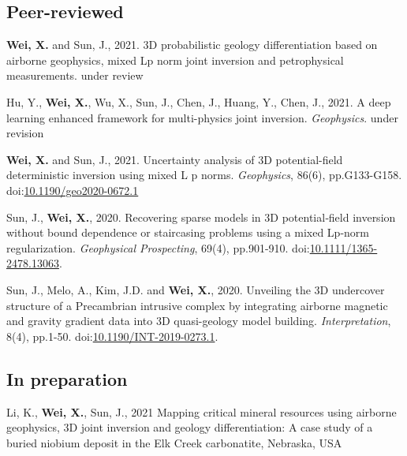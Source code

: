 \documentclass[11pt, a4paper]{article}
\newcommand{\LastName}{Wei}
\newcommand{\Initials}{X}
\newcommand{\Wei}{\textbf{\LastName, \Initials.}}  %
\newcommand{\WeiSun}{\textbf{\LastName, \Initials.} and Sun, J.}  %
\newcommand{\Review}{under review}
\newcommand{\Revision}{under revision}
\newcommand{\DOI}[1]{doi:\href{https://doi.org/#1}{#1}}
\begin{document}
\subsection*{Peer-reviewed}
\begin{etaremune}
	
	\item 
	\WeiSun, 2021. 3D probabilistic geology differentiation based on airborne geophysics, mixed Lp norm joint inversion and petrophysical measurements. \Review
	
	\item 
	Hu, Y., \Wei, Wu, X., Sun, J., Chen, J., Huang, Y., Chen, J., 2021. A deep learning enhanced framework for multi-physics joint inversion. \emph{Geophysics}. \Revision
	
	\item
	\WeiSun, 2021. Uncertainty analysis of 3D potential-field deterministic inversion using mixed L p norms. \emph{Geophysics}, 86(6), pp.G133-G158.
	\DOI{10.1190/geo2020-0672.1}

	\item
	Sun, J., \Wei, 2020. Recovering sparse models in 3D potential‐field inversion without bound dependence or staircasing problems using a mixed Lp‐norm regularization. \emph{Geophysical Prospecting}, 69(4), pp.901-910.
	\DOI{10.1111/1365-2478.13063}.

	\item
	Sun, J., Melo, A., Kim, J.D. and \Wei, 2020. Unveiling the 3D undercover structure of a Precambrian intrusive complex by integrating airborne magnetic and gravity gradient data into 3D quasi-geology model building. \emph{Interpretation}, 8(4), pp.1-50.
	\DOI{10.1190/INT-2019-0273.1}.

\end{etaremune}

\subsection*{In preparation}
\begin{etaremune}
	
	\item 
	Li, K., \Wei, Sun, J., 2021 Mapping critical mineral resources using airborne geophysics, 3D joint inversion and geology differentiation: A case study of a buried niobium deposit in the Elk Creek carbonatite, Nebraska, USA
	
\end{etaremune}
\end{document}
